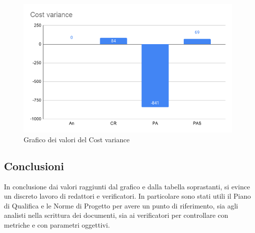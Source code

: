     \begin{figure}[H]
        \centering
        \includegraphics[width=10 cm]{source/sections/images/cost_variance.png}
        \caption{Grafico dei valori del Cost variance}
    \end{figure}
    

\subsection{Conclusioni}

In conclusione dai valori raggiunti dal grafico e dalla tabella soprastanti, si evince un discreto lavoro di redattori e verificatori. In particolare sono stati utili il Piano di Qualifica e le Norme di Progetto per avere un punto di riferimento, sia agli analisti nella scrittura dei documenti, sia ai verificatori per controllare con metriche e con parametri oggettivi.

